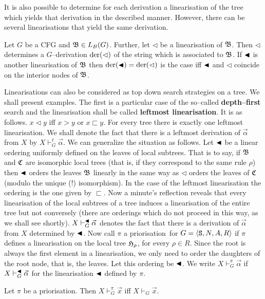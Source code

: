 It is also possible to determine for each derivation a
linearisation of the tree which yields that derivation in the
described manner. However, there can be several linearisations
that yield the same derivation.
\begin{thm}
\index{$\der(\lhd)$}%
Let $G$ be a CFG and $\mathfrak{B} \in L_B(G)$. Further, let
$\lhd$ be a linearisation of $\mathfrak{B}$. Then $\lhd$ determines
a $G$--derivation $\der(\lhd)$ of the string
which is associated to $\mathfrak{B}$. If $\blacktriangleleft$ is another linearisation
of $\mathfrak{B}$ then $\operatorname{der}(\blacktriangleleft) = \operatorname{der}(\lhd)$
is the case iff $\blacktriangleleft$ and $\lhd$ coincide on the
interior nodes of $\mathfrak{B}$.
\proofend
\end{thm}
Linearisations can also be considered as top down search strategies
on a tree. We shall present examples. The first is a particular
case of the so--called
\textbf{depth--first} search and the linearisation shall be called
\textbf{leftmost linearisation}.  It is as follows.
$x \lhd y$  iff $x > y$ or $x \sqsubset y$.
For every tree there is exactly one leftmost linearisation.
We shall denote the fact that there is a leftmost
derivation of $\vec{\alpha}$ from $X$ by $X \vdash_G^{\ell}
\vec{\alpha}$. We can generalize the situation as follows.
Let $\blacktriangleleft$ be a linear ordering uniformly defined on the
leaves of local  subtrees. That is to say, if $\mathfrak{B}$ and $\mathfrak{C}$
are isomorphic local trees (that is, if they correspond to the
same rule $\rho$) then $\blacktriangleleft$ orders the leaves $\mathfrak{B}$ linearly
in the same way as $\lhd$ orders the leaves of $\mathfrak{C}$ (modulo
the unique (!) isomorphism). In the case of the leftmost
linearisation the ordering is the one given by $\sqsubset$.
Now a minute's reflection reveals that every linearisation of
the local subtrees of a tree induces a linearisation of the entire
tree but not conversely (there are orderings which do not
proceed in this way, as we shall see shortly).
$X \vdash_G^{\blacktriangleleft} \vec{\alpha}$ denotes the fact that there
is a derivation of $\vec{\alpha}$ from $X$ determined by
$\blacktriangleleft$. Now call $\pi$
a \mbox{priorisation for} $G = \langle \mbox{\tt S}, N, A, R\rangle$ if
$\pi$ defines a linearisation on the local tree $\mathfrak{H}_{\rho}$,
for every $\rho \in R$. Since the root is always the first
element in a linearisation, we only need to order the daughters
of the root node, that is, the leaves. Let this ordering be
$\blacktriangleleft$. We write $X \vdash_G^{\pi} \vec{\alpha}$ if
$X \vdash_G^{\blacktriangleleft} \vec{\alpha}$ for the linearisation $\blacktriangleleft$
defined by $\pi$.
\begin{prop}
Let $\pi$ be a priorisation. Then $X \vdash_G^{\pi} \vec{x}$
iff $X \vdash_G \vec{x}$.
\end{prop}
